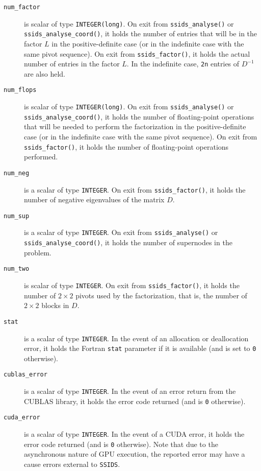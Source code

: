 \begin{description}
\item[\texttt{num\_factor}] is scalar of type {\tt INTEGER(long)}. On exit from
{\tt ssids\_analyse()}  or {\tt ssids\_analyse\_coord()}, it holds the number of entries that will be in the
factor $L$ in the positive-definite case (or in the indefinite case with
the same pivot sequence). On exit from
{\tt ssids\_factor()},
it holds the actual number of entries in the factor
$L$. In the indefinite case, {\tt 2n} entries of ${D}^{-1}$ are
also held.

\item[\texttt{num\_flops}] is scalar of type {\tt INTEGER(long)}. On exit from
{\tt ssids\_analyse()}  or {\tt ssids\_analyse\_coord()}, it holds the number of
floating-point operations that
will be needed to perform the factorization
in the positive-definite case (or in the indefinite case  with
the same pivot sequence).  On exit from {\tt ssids\_factor()}, it holds the
number of floating-point operations performed.

\item[\texttt{num\_neg}] is a scalar  of type  {\tt INTEGER}.
On exit from {\tt ssids\_factor()}, it holds
the number of negative eigenvalues of the matrix $D$.


\item[\texttt{num\_sup}] is a scalar of type  {\tt INTEGER}.
On exit from {\tt ssids\_analyse()}  or {\tt ssids\_analyse\_coord()}, it holds
the number of supernodes in the problem.

\item[\texttt{num\_two}] is scalar of type  {\tt INTEGER}.
On exit from
{\tt ssids\_factor()}, it holds the number
of $2 \times 2$ pivots used by the factorization, that is,
the number of $2 \times 2$ blocks in $D$.

\item[\texttt{stat}] is a scalar of type  {\tt INTEGER}.
In the event of an allocation or deallocation error, it
holds the Fortran {\tt stat} parameter if it is available
(and is set to {\tt 0} otherwise).

\item[\texttt{cublas\_error}] is a scalar of type {\tt INTEGER}.
In the event of an error return from the CUBLAS library, it
holds the error code returned (and is {\tt 0} otherwise).

\item[\texttt{cuda\_error}] is a scalar of type {\tt INTEGER}.
In the event of a CUDA error, it holds the error code returned (and is {\tt 0}
otherwise). Note that due to the asynchronous nature of GPU execution, the
reported error may have a cause errors external to {\tt SSIDS}.

\end{description}



